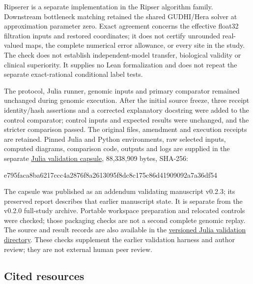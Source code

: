 \documentclass[
  11pt,
]{article}
\newenvironment{Shaded}{}{}
\newcommand{\NormalTok}[1]{#1}
\begin{document}
Ripserer is a separate implementation in the Ripser algorithm family.
Downstream bottleneck matching retained the shared GUDHI/Hera solver at
approximation parameter zero. Exact agreement concerns the effective
float32 filtration inputs and restored coordinates; it does not certify
unrounded real-valued maps, the complete numerical error allowance, or
every site in the study. The check does not establish independent-model
transfer, biological validity or clinical superiority. It supplies no
Lean formalization and does not repeat the separate exact-rational
conditional label tests.

The protocol, Julia runner, genomic inputs and primary comparator
remained unchanged during genomic execution. After the initial source
freeze, three receipt identity/hash assertions and a corrected
explanatory docstring were added to the control comparator; control
inputs and expected results were unchanged, and the stricter comparison
passed. The original files, amendment and execution receipts are
retained. Pinned Julia and Python environments, raw selected inputs,
computed diagrams, comparison code, outputs and logs are supplied in the
separate
\href{https://github.com/patrickiben/contact-map-anchor-audit/releases/download/v0.2.3/JULIA_PERSISTENCE_VALIDATION_2026-10-28.zip}{Julia
validation capsule}, 88,338,909 bytes, SHA-256:

\begin{Shaded}
\begin{Highlighting}[]
\NormalTok{e795faca8ba6217ccc4a2876f8a2613095f8dc8c175c86d41909092a7a36df54}
\end{Highlighting}
\end{Shaded}

The capsule was published as an addendum validating manuscript v0.2.3;
its preserved report describes that earlier manuscript state. It is
separate from the v0.2.0 full-study archive. Portable workspace
preparation and relocated controls were checked; those packaging checks
are not a second complete genomic replay. The source and result records
are also available in the
\href{https://github.com/patrickiben/contact-map-anchor-audit/tree/cd7b1352885f73dca0e1b1477c96d1db39a97382/research/julia_validation}{versioned
Julia validation directory}. These checks supplement the earlier
validation harness and author review; they are not external human peer
review.

\subsection{Cited resources}\label{cited-resources}
\end{document}
